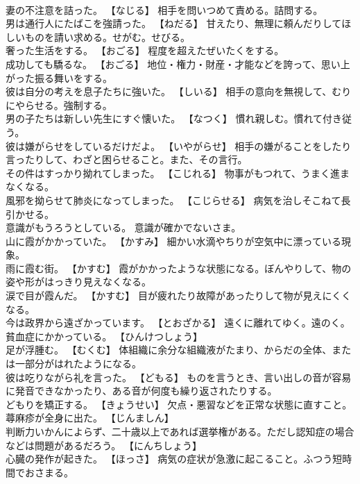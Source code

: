 \documentclass[8pt]{extreport}
\begin{document}
\begin{CJK}{UTF8}{min}
\\	妻の不注意を詰った。	【なじる】 相手を問いつめて責める。詰問する。
\\	男は通行人にたばこを強請った。	【ねだる】 甘えたり、無理に頼んだりしてほしいものを請い求める。せがむ。せびる。
\\	奢った生活をする。	【おごる】 程度を超えたぜいたくをする。
\\	成功しても驕るな。	【おごる】 地位・権力・財産・才能などを誇って、思い上がった振る舞いをする。
\\	彼は自分の考えを息子たちに強いた。	【しいる】 相手の意向を無視して、むりにやらせる。強制する。
\\	男の子たちは新しい先生にすぐ懐いた。	【なつく】 慣れ親しむ。慣れて付き従う。
\\	彼は嫌がらせをしているだけだよ。	【いやがらせ】 相手の嫌がることをしたり言ったりして、わざと困らせること。また、その言行。
\\	その件はすっかり拗れてしまった。	【こじれる】 物事がもつれて、うまく進まなくなる。
\\	風邪を拗らせて肺炎になってしまった。	【こじらせる】 病気を治しそこねて長引かせる。
\\	意識がもうろうとしている。	意識が確かでないさま。
\\	山に霞がかかっていた。	【かすみ】 細かい水滴やちりが空気中に漂っている現象。
\\	雨に霞む街。	【かすむ】 霞がかかったような状態になる。ぼんやりして、物の姿や形がはっきり見えなくなる。
\\	涙で目が霞んだ。	【かすむ】 目が疲れたり故障があったりして物が見えにくくなる。
\\	今は政界から遠ざかっています。	【とおざかる】 遠くに離れてゆく。遠のく。
\\	貧血症にかかっている。	【ひんけつしょう】 
\\	足が浮腫む。	【むくむ】 体組織に余分な組織液がたまり、からだの全体、または一部分がはれたようになる。
\\	彼は吃りながら礼を言った。	【どもる】 ものを言うとき、言い出しの音が容易に発音できなかったり、ある音が何度も繰り返されたりする。
\\	どもりを矯正する。	【きょうせい】 欠点・悪習などを正常な状態に直すこと。
\\	蕁麻疹が全身に出た。	【じんましん】 
\\	判断力いかんによらず、二十歳以上であれば選挙権がある。ただし認知症の場合などは問題があるだろう。	【にんちしょう】 
\\	心臓の発作が起きた。	【ほっさ】 病気の症状が急激に起こること。ふつう短時間でおさまる。

\end{CJK}
\end{document}

